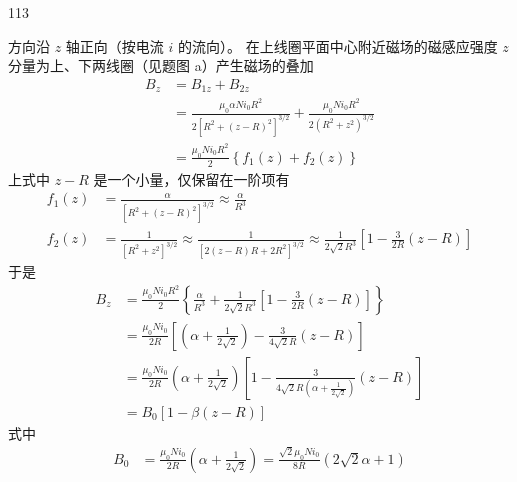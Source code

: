 \begin{solution}{113}
\begin{subsolution}
\begin{subsubsolution}
            方向沿 $z$ 轴正向（按电流 $i$ 的流向）。
            在上线圈平面中心附近磁场的磁感应强度 $z$ 分量为上、下两线圈（见题图 a）产生磁场的叠加
            \begin{equation}
                \begin{aligned}
                    B_{z} &= B_{1z} + B_{2z} \\
                    &= \frac{\mu_{0} \alpha N i_{0} R^{2}}{2 [ R^{2} + (z - R)^{2} ]^{3/2}} + \frac{\mu_{0} N i_{0} R^{2}}{2 (R^{2} + z^{2})^{3/2}} \\
                    &= \frac{\mu_{0} N i_{0} R^{2}}{2} \left\{f_{1}(z) + f_{2}(z)\right\}
                \end{aligned}
                \label{eq:5.s113}
            \end{equation}
            上式中 $z - R$ 是一个小量，仅保留在一阶项有
            \begin{align}
                f_{1}(z) &= \frac{\alpha}{[ R^{2} + (z - R)^{2} ]^{3/2}} \approx \frac{\alpha}{R^{3}} \label{eq:6.s113} \\
                f_{2}(z) &= \frac{1}{[ R^{2} + z^{2} ]^{3/2}} \approx \frac{1}{[ 2 (z - R) R + 2 R^{2} ]^{3/2}} \approx \frac{1}{2 \sqrt{2} R^{3}} \left[ 1 - \frac{3}{2 R} (z - R) \right] \label{eq:7.s113}
            \end{align}
            于是
            \begin{equation}
                \begin{aligned}
                    B_{z} &= \frac{\mu_{0} N i_{0} R^{2}}{2} \left\{\frac{\alpha}{R^{3}} + \frac{1}{2 \sqrt{2} R^{3}} \left[ 1 - \frac{3}{2 R} (z - R) \right] \right\} \\
                    &= \frac{\mu_{0} N i_{0}}{2 R} \left[ \left(\alpha + \frac{1}{2 \sqrt{2}}\right) - \frac{3}{4 \sqrt{2} R} (z - R) \right] \\
                    &= \frac{\mu_{0} N i_{0}}{2 R} \left(\alpha + \frac{1}{2 \sqrt{2}}\right) \left[ 1 - \frac{3}{4 \sqrt{2} R (\alpha + \frac{1}{2 \sqrt{2}})} (z - R) \right] \\
                    &= B_{0} [ 1 - \beta (z - R) ]
                \end{aligned}
                \label{eq:8.s113}
            \end{equation}
            式中
            \begin{align}
                B_{0} &= \frac{\mu_{0} N i_{0}}{2 R} \left(\alpha + \frac{1}{2 \sqrt{2}}\right) = \frac{\sqrt{2} \mu_{0} N i_{0}}{8 R} (2 \sqrt{2} \alpha + 1) \label{eq:9.s113} \\

\end{align}
\end{subsubsolution}
\end{subsolution}
\end{solution}
